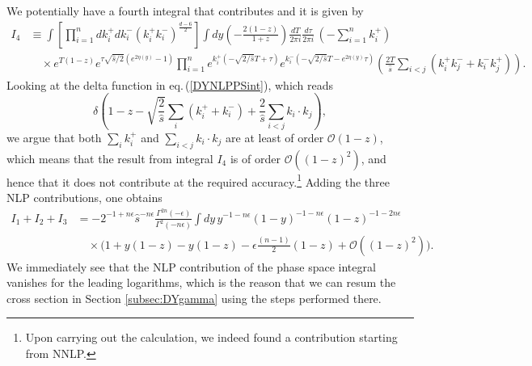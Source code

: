 \documentclass[11pt]{article}
\newcommand{\eps}{\epsilon}
\newcommand{\s}{\hat{s}}
\newcommand\eqn[1]     {eq.\,(\ref{#1})}
\begin{document}
We potentially have a fourth integral that contributes and it is given by
\begin{align}
    I_4 &\equiv \int\left[\prod_{i=1}^n dk_i^+dk_i^-(k_i^+k_i^-)^{\frac{d-6}{2}}\right] \int dy \left(-\frac{2(1-z)}{1+z}\right)\frac{dT}{2\pi i} \frac{d\tau}{2\pi i}\, \left(-\sum_{i=1}^nk_i^+\right)\nonumber \\
    &\quad\times e^{T(1-z)}e^{\tau\sqrt{\s/2}(e^{2\eta(y)}-1)}\prod_{i=1}^n e^{k_i^+(-\sqrt{2/\s}T+\tau)}e^{k_i^-(-\sqrt{2/\s}T-e^{2\eta(y)}\tau)}\left(\frac{2T}{\s}\sum_{i<j}(k_i^+k_j^-+k_i^-k_j^+)\right).
\end{align}
Looking at the delta function in \eqn{DYNLPPSint}, which reads
\begin{equation}
    \delta\left(1-z-\sqrt{\frac{2}{\s}}\sum_i(k_i^++k_i^-)+\frac{2}{\s}\sum_{i<j}k_i\cdot k_j\right),
\end{equation}
we argue that both $\sum_i k_i^+$ and $\sum_{i<j}k_i\cdot k_j$ are at least of order $\mathcal{O}(1-z)$, which means that the result from integral $I_4$ is of order $\mathcal{O}\left((1-z)^2\right)$, and hence that it does not contribute at the required accuracy.\footnote{Upon carrying out the calculation, we indeed found a contribution starting from NNLP.} Adding the three NLP contributions, one obtains
\begin{align}
    I_1+I_2+I_3 &= -2^{-1+n\epsilon}\s^{-n\epsilon}\frac{\Gamma^{2n}\left(-\epsilon\right)}{\Gamma^2\left(-n\epsilon\right)}\int dy\,y^{-1-n\eps}(1-y)^{-1-n\eps}(1-z)^{-1-2n\epsilon}\nonumber\\
    &\quad\times\bigg(1+y(1-z)-y(1-z)-\epsilon\frac{(n-1)}{2}(1-z)+\mathcal{O}\left((1-z)^2\right)\bigg).
\end{align}
We immediately see that the NLP contribution of the phase space integral vanishes for the leading logarithms, which is the reason that we can resum the cross section in Section \ref{subsec:DYgamma} using the steps performed there.



\end{document}
